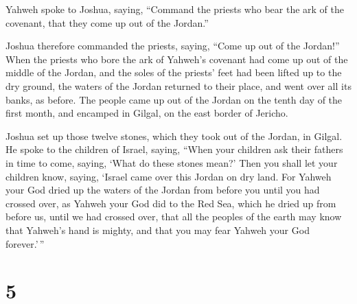  Yahweh spoke to Joshua, saying,  ``Command
the priests who bear the ark of the covenant, that they come up out of
the Jordan.''

 Joshua therefore commanded the priests, saying, ``Come up
out of the Jordan!''  When the priests who bore the ark of
Yahweh's covenant had come up out of the middle of the Jordan, and the
soles of the priests' feet had been lifted up to the dry ground, the
waters of the Jordan returned to their place, and went over all its
banks, as before.  The people came up out of the Jordan on
the tenth day of the first month, and encamped in Gilgal, on the east
border of Jericho.

 Joshua set up those twelve stones, which they took out of
the Jordan, in Gilgal.  He spoke to the children of Israel,
saying, ``When your children ask their fathers in time to come, saying,
`What do these stones mean?'  Then you shall let your
children know, saying, `Israel came over this Jordan on dry land.
 For Yahweh your God dried up the waters of the Jordan from
before you until you had crossed over, as Yahweh your God did to the Red
Sea, which he dried up from before us, until we had crossed over,
 that all the peoples of the earth may know that Yahweh's
hand is mighty, and that you may fear Yahweh your God forever.'\,''

\hypertarget{section-4}{%
\section{5}\label{section-4}}

